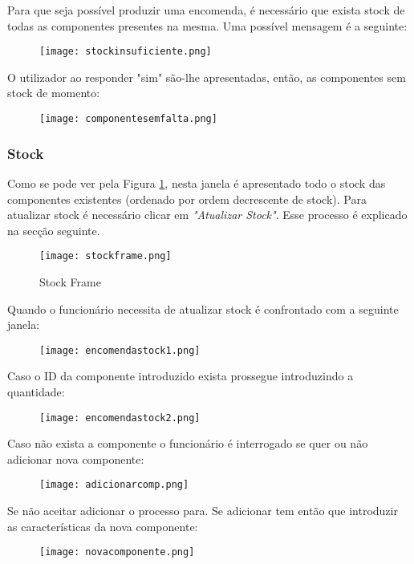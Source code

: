
Para que seja possível produzir uma encomenda, é necessário que exista stock de todas as componentes presentes na mesma. Uma possível mensagem é a seguinte:

\begin{figure}[H]
	\centering
	\texttt{[image: stockinsuficiente.png]}
\end{figure}

O utilizador ao responder "sim" são-lhe apresentadas, então, as componentes sem stock de momento:

\begin{figure}[H]
	\centering
	\texttt{[image: componentesemfalta.png]}
\end{figure}

\subsubsection{Stock}
Como se pode ver pela Figura \ref{stockframe}, nesta janela é apresentado todo o stock das componentes existentes (ordenado por ordem decrescente de stock). Para atualizar stock é necessário clicar em \textit{"Atualizar Stock"}. Esse processo é explicado na secção seguinte.

\begin{figure}[H]
	\centering
	\texttt{[image: stockframe.png]}
	\caption{Stock Frame}
	\label{stockframe}
\end{figure}


Quando o funcionário necessita de atualizar stock é confrontado com a seguinte janela:
\begin{figure}[H]
	\centering
	\texttt{[image: encomendastock1.png]}
\end{figure}

Caso o ID da componente introduzido exista prossegue introduzindo a quantidade:

\begin{figure}[H]
	\centering
	\texttt{[image: encomendastock2.png]}
\end{figure}

Caso não exista a componente o funcionário é interrogado se quer ou não adicionar nova componente:
\begin{figure}[H]
	\centering
	\texttt{[image: adicionarcomp.png]}
\end{figure}

Se não aceitar adicionar o processo para. Se adicionar tem então que introduzir as características da nova componente:
\begin{figure}[H]
	\centering
	\texttt{[image: novacomponente.png]}
\end{figure}

